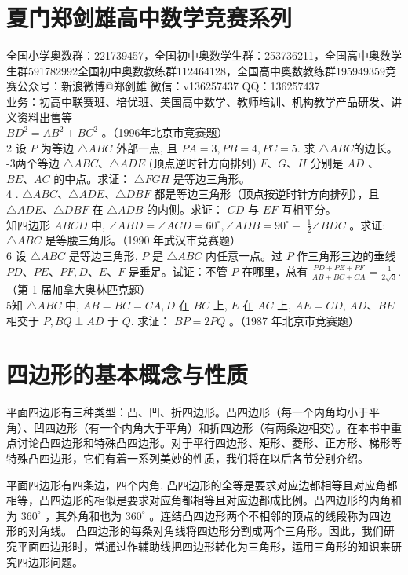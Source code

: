 \documentclass[10pt]{article}
\begin{document}
\section*{夏门郑剑雄高中数学竞赛系列}
全国小学奥数群：221739457，全国初中奥数学生群：253736211，全国高中奥数学生群591782992全国初中奥数教练群112464128，全国高中奥数教练群195949359竞赛公众号：新浪微博@郑剑雄 微信：v136257437 QQ：136257437\\
业务：初高中联赛班、培优班、美国高中数学、教师培训、机构教学产品研发、讲义资料出售等\\
$B D^{2}=A B^{2}+B C^{2}$ 。（1996年北京市竞赛题）\\
2 设 $P$ 为等边 $\triangle A B C$ 外部一点, 且 $P A=3, P B=4, P C=5$. 求 $\triangle A B C$的边长。\\
-3两个等边 $\triangle A B C 、 \triangle A D E$ (顶点逆时针方向排列) $F 、 G 、 H$ 分别是 $A D$ 、 $B E 、 A C$ 的中点。求证： $\triangle F G H$ 是等边三角形。\\
4 . $\triangle A B C 、 \triangle A D E 、 \triangle D B F$ 都是等边三角形（顶点按逆时针方向排列），且 $\triangle A D E 、 \triangle D B F$ 在 $\triangle A D B$ 的内侧。求证： $C D$ 与 $E F$ 互相平分。\\
知四边形 $A B C D$ 中, $\angle A B D=\angle A C D=60^{\circ}, \angle A D B=90^{\circ}-$ $\frac{1}{2} \angle B D C$ 。求证: $\triangle A B C$ 是等腰三角形。（1990 年武汉市竞赛题）\\
6 设 $\triangle A B C$ 是等边三角形, $P$ 是 $\triangle A B C$ 内任意一点。过 $P$ 作三角形三边的垂线 $P D 、 P E 、 P F, D 、 E 、 F$ 是垂足。试证：不管 $P$ 在哪里，总有 $\frac{P D+P E+P F}{A B+B C+C A}=\frac{1}{2 \sqrt{3}}$.（第 1 届加拿大奥林匹克题）\\
5知 $\triangle A B C$ 中, $A B=B C=C A, D$ 在 $B C$ 上, $E$ 在 $A C$ 上, $A E=C D$, $A D 、 B E$ 相交于 $P, B Q \perp A D$ 于 $Q$. 求证： $B P=2 P Q$ 。（1987 年北京市竞赛题）

\section*{四边形的基本概念与性质}
平面四边形有三种类型：凸、凹、折四边形。凸四边形（每一个内角均小于平角）、凹四边形（有一个内角大于平角）和折四边形（有两条边相交）。在本书中重点讨论凸四边形和特殊凸四边形。对于平行四边形、矩形、菱形、正方形、梯形等特殊凸四边形，它们有着一系列美妙的性质，我们将在以后各节分别介绍。

平面四边形有四条边，四个内角. 凸四边形的全等是要求对应边都相等且对应角都相等，凸四边形的相似是要求对应角都相等且对应边都成比例。凸四边形的内角和为 $360^{\circ}$ ，其外角和也为 $360^{\circ}$ 。连结凸四边形两个不相邻的顶点的线段称为四边形的对角线。 凸四边形的每条对角线将四边形分割成两个三角形。因此，我们研究平面四边形时，常通过作辅助线把四边形转化为三角形，运用三角形的知识来研究四边形问题。
\end{document}
